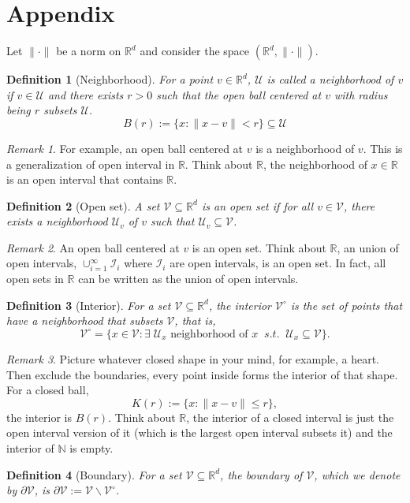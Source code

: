 \documentclass{article}
\newtheorem{definition}{Definition}
\newcommand{\R}{\mathbb{R}}
\newcommand{\N}{\mathbb{N}}
\DeclareMathOperator*{\1}{\mathbbm{1}}
\theoremstyle{definition}
\theoremstyle{remark}
\newtheorem{remark}{Remark}
\newcommand{\cU}{\mathcal{U}}
\newcommand{\cV}{\mathcal{V}}
\newcommand{\cI}{\mathcal{I}}
\begin{document}
  \section{Appendix}
  Let $\|\cdot\|$ be a norm on $\R^d$ and consider the space $(\R^d, \|\cdot\|)$. 
  \begin{definition}[Neighborhood]
    For a point $v\in \R^d$, $\cU$ is called a neighborhood of $v$ if $v\in \cU$ and there exists $r>0$ such that the open ball centered at $v$ with radius being $r$ subsets $\cU$. 
  \[B(r):=\{x:\|x-v\|<r\}\subseteq \cU\]
  \end{definition}
  \begin{remark}
    For example, an open ball centered at $v$ is a neighborhood of $v$. This is a generalization of open interval in $\R$. Think about $\R$, the neighborhood of $x\in \R$ is an open interval that contains $\R$.
  \end{remark}
  \begin{definition}[Open set]
    A set $\cV\subseteq \R^d$ is an open set if for all $v\in \cV$, there exists a neighborhood $\cU_v$ of $v$ such that $\cU_v\subseteq \cV$.
  \end{definition}
  \begin{remark}
    An open ball centered at $v$ is an open set. Think about $\R$, an union of open intervals, $\cup_{i=1}^\infty \cI_i$ where $\cI_i$ are open intervals, is an open set. In fact, all open sets in $\R$ can be written as the union of open intervals.
  \end{remark}
  \begin{definition}[Interior]
    For a set $\cV\subseteq\R^d$, the interior $\cV^\circ$ is the set of points that have a neighborhood that subsets $\cV$, that is,
    \[\cV^\circ = \{x\in \cV: \exists 
    \;\cU_x \text{ neighborhood of }x \;\; s.t. \;\;\cU_x\subseteq\cV\}.\]
  \end{definition} 
  \begin{remark}
    Picture whatever closed shape in your mind, for example, a heart. Then exclude the boundaries, every point inside forms the interior of that shape. For a closed ball, \[K(r):=\{x:\|x-v\|\le r\},\]
    the interior is $B(r)$. Think about $\R$, the interior of a closed interval is just the open interval version of it (which is the largest open interval subsets it) and the interior of $\N$ is empty.
  \end{remark}

  \begin{definition}[Boundary]
    For a set $\cV\subseteq\R^d$, the boundary of $\cV$, which we denote by $\partial \cV$, is $\partial \cV := \cV\backslash \cV^\circ$.
  \end{definition}

  
\end{document}
